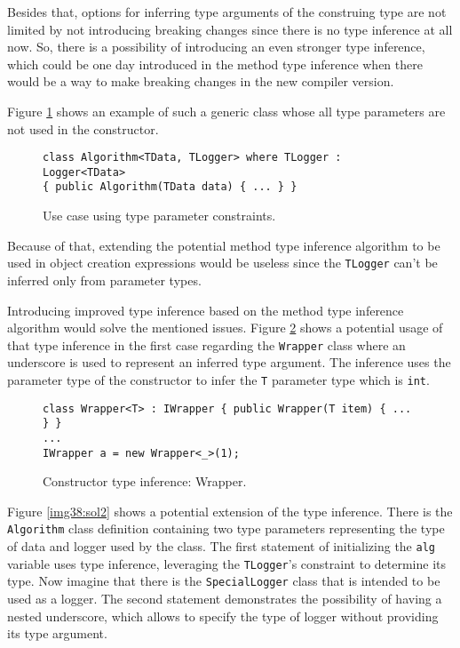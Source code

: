 Besides that, options for inferring type arguments of the construing type are not limited by not introducing breaking changes since there is no type inference at all now. 
So, there is a possibility of introducing an even stronger type inference, which could be one day introduced in the method type inference when there would be a way to make breaking changes in the new compiler version. 
\par
Figure \ref{img36:cti} shows an example of such a generic class whose all type parameters are not used in the constructor.
\begin{figure}[h]
\begin{lstlisting}[style=csharp]
class Algorithm<TData, TLogger> where TLogger : Logger<TData> 
{ public Algorithm(TData data) { ... } }
\end{lstlisting}
\caption{Use case using type parameter constraints.}
\label{img36:cti}
\end{figure}
\newpage
Because of that, extending the potential method type inference algorithm to be used in object creation expressions would be useless since the \texttt{TLogger} can’t be inferred only from parameter types.
\par
Introducing improved type inference based on the method type inference algorithm would solve the mentioned issues. 
Figure \ref{img37:sol1} shows a potential usage of that type inference in the first case regarding the \texttt{Wrapper} class where an underscore is used to represent an inferred type argument. 
The inference uses the parameter type of the constructor to infer the \texttt{T} parameter type which is \texttt{int}.
\begin{figure}[h]
\begin{lstlisting}[style=csharp]
class Wrapper<T> : IWrapper { public Wrapper(T item) { ... } }
...
IWrapper a = new Wrapper<_>(1);
\end{lstlisting}
\caption{Constructor type inference: Wrapper.}
\label{img37:sol1}
\end{figure}
\par
Figure \ref{img38:sol2} shows a potential extension of the type inference. 
There is the \texttt{Algorithm} class definition containing two type parameters representing the type of data and logger used by the class.
The first statement of initializing the \texttt{alg} variable uses type inference, leveraging the \texttt{TLogger}’s constraint to determine its type.
Now imagine that there is the \texttt{SpecialLogger} class that is intended to be used as a logger.
The second statement demonstrates the possibility of having a nested underscore, which allows to specify the type of logger without providing its type argument.
